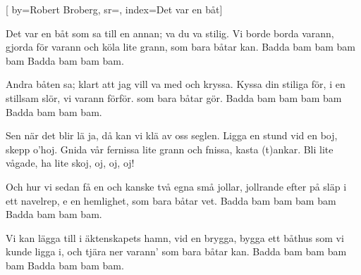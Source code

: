 


[ 	%
	by={Robert Broberg},	%
	sr={},			%
	index={Det var en båt}]		%
	
\beginverse*		%
Det var en båt som sa till en annan;
va du va stilig. Vi borde borda varann,
gjorda för varann och köla lite grann,
som bara båtar kan.
Badda bam bam bam bam
Badda bam bam bam.
\endverse			%

\beginverse*		%
Andra båten sa;
klart att jag vill va
med och kryssa.
Kyssa din stiliga för,
i en stillsam slör,
vi varann förför.
som bara båtar gör.
Badda bam bam bam bam
Badda bam bam bam.
\endverse			%

\beginverse*		%
Sen när det blir lä
ja, då kan vi klä av oss seglen.
Ligga en stund vid en boj,
skepp o'hoj.
Gnida vår fernissa lite grann och fnissa,
kasta (t)ankar.
Bli lite vågade, ha lite skoj,
oj, oj, oj!
\endverse			%

\beginverse*		%
Och hur vi sedan få
en och kanske två egna små jollar,
jollrande efter på släp
i ett navelrep,
e en hemlighet,
som bara båtar vet.
Badda bam bam bam bam
Badda bam bam bam.
\endverse			%

\beginverse*		%
Vi kan lägga till i äktenskapets hamn,
vid en brygga,
bygga ett båthus som vi kunde ligga i,
och tjära ner varann'
som bara båtar kan.
Badda bam bam bam bam
Badda bam bam bam.
\endverse			%
\endsong			%
